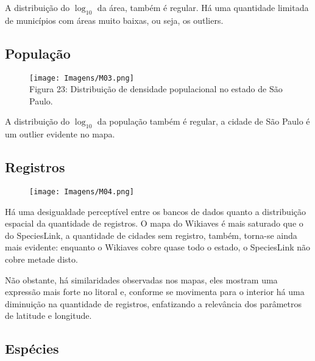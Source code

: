 \documentclass[12pt]{extarticle}
\newenvironment{resposta}{ \color{mygray}}{}
\begin{document}
\begin{resposta}
A distribuição do $\log_{10}$ da área, também é regular. Há uma quantidade limitada de municípios com áreas muito baixas, ou seja, os outliers.
\end{resposta}


\subsection {População}

\newpage

\begin{figure}[h!]
\centering
\texttt{[image: Imagens/M03.png]}
\\{\scriptsize Figura 23: Distribuição de densidade populacional no estado de São Paulo.}
\end{figure}

\begin{resposta}
A distribuição do $\log_{10}$ da população também é regular, a cidade de São Paulo é um outlier evidente no mapa.
\end{resposta}

\subsection {Registros}

\begin{figure}[h!]
\centering
\texttt{[image: Imagens/M04.png]}
\end{figure}

\begin{resposta}
Há uma desigualdade perceptível entre os bancos de dados quanto a distribuição espacial da quantidade de registros. O mapa do Wikiaves é mais saturado que o do SpeciesLink, a quantidade de cidades sem registro, também, torna-se ainda mais evidente: enquanto o Wikiaves cobre quase todo o estado, o SpeciesLink não cobre metade disto. 

Não obstante, há similaridades observadas nos mapas, eles mostram uma expressão mais forte no litoral e, conforme se movimenta para  o interior há uma diminuição na quantidade de registros, enfatizando a relevância dos parâmetros de latitude e longitude.
\end{resposta}

\subsection {Espécies}
\end{document}
